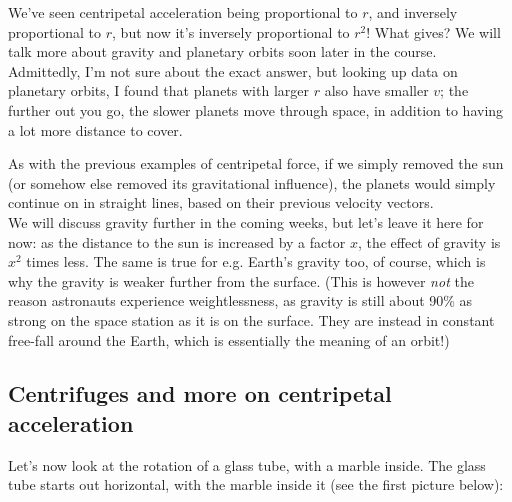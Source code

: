 We've seen centripetal acceleration being proportional to $r$, and inversely proportional to $r$, but now it's inversely proportional to $r^2$! What gives? We will talk more about gravity and planetary orbits soon later in the course. Admittedly, I'm not sure about the exact answer, but looking up data on planetary orbits, I found that planets with larger $r$ also have smaller $v$; the further out you go, the slower planets move through space, in addition to having a lot more distance to cover.

As with the previous examples of centripetal force, if we simply removed the sun (or somehow else removed its gravitational influence), the planets would simply continue on in straight lines, based on their previous velocity vectors.\\
We will discuss gravity further in the coming weeks, but let's leave it here for now: as the distance to the sun is increased by a factor $x$, the effect of gravity is $x^2$ times less. The same is true for e.g. Earth's gravity too, of course, which is why the gravity is weaker further from the surface. (This is however \emph{not} the reason astronauts experience weightlessness, as gravity is still about 90\% as strong on the space station as it is on the surface. They are instead in constant free-fall around the Earth, which is essentially the meaning of an orbit!)

\subsection{Centrifuges and more on centripetal acceleration}

Let's now look at the rotation of a glass tube, with a marble inside. The glass tube starts out horizontal, with the marble inside it (see the first picture below):

